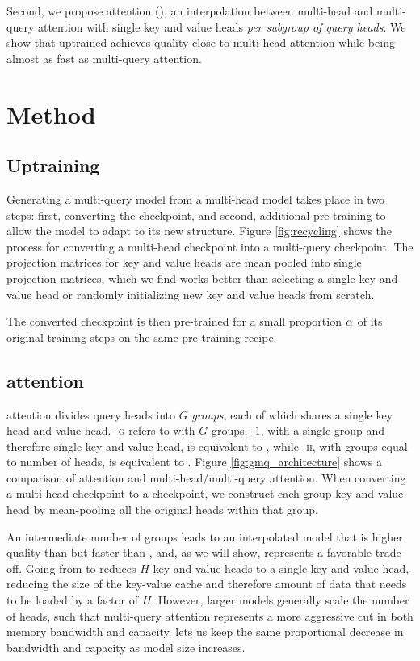 \documentclass[11pt]{article}
\begin{document}
Second, we propose \fullgmq attention (\gmq), an interpolation between multi-head and multi-query attention with single key and value heads \emph{per subgroup of query heads}. We show that uptrained \gmq achieves quality close to multi-head attention while being almost as fast as multi-query attention.

\section{Method}
\label{section:method}



\subsection{Uptraining}

Generating a multi-query model from a multi-head model takes place in two steps: first, converting the checkpoint, and second, additional pre-training to allow the model to adapt to its new structure. Figure \ref{fig:recycling} shows the process for converting a multi-head checkpoint into a multi-query checkpoint. The projection matrices for key and value heads are mean pooled into single projection matrices, which we find works better than selecting a single key and value head or randomly initializing new key and value heads from scratch.



The converted checkpoint is then pre-trained for a small proportion $\alpha$ of its original training steps on the same pre-training recipe.

\subsection{\fullgmqcap attention}

\fullgmqcap attention divides query heads into $G$ \emph{groups}, each of which shares a single key head and value head. \gmq-\textsc{g} refers to \fullgmq with $G$ groups. \gmq-$1$, with a single group and therefore single key and value head, is equivalent to \mq, while \gmq-\textsc{h}, with groups equal to number of heads, is equivalent to \mh. Figure \ref{fig:gmq_architecture} shows a comparison of \fullgmq attention and multi-head/multi-query attention. When converting a multi-head checkpoint to a \gmq checkpoint, we construct each group key and value head by mean-pooling all the original heads within that group.

An intermediate number of groups leads to an interpolated model that is higher quality than \mq but faster than \mh, and, as we will show, represents a favorable trade-off. Going from \mh to \mq reduces $H$ key and value heads to a single key and value head, reducing the size of the key-value cache and therefore amount of data that needs to be loaded by a factor of $H$. However, larger models generally scale the number of heads, such that multi-query attention represents a more aggressive cut in both memory bandwidth and capacity. \gmq lets us keep the same proportional decrease in bandwidth and capacity as model size increases.
\end{document}
